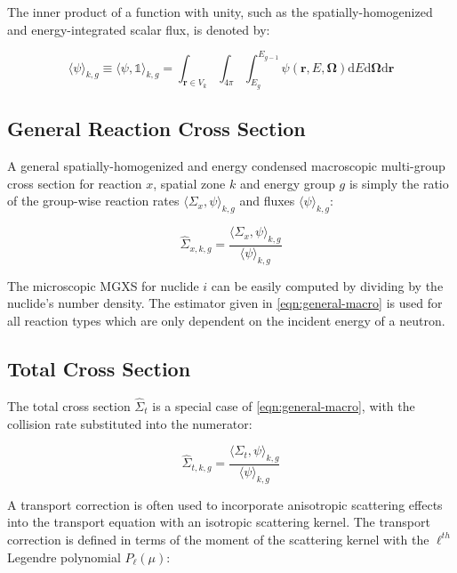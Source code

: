 \noindent The inner product of a function with unity, such as the spatially-homogenized and energy-integrated scalar flux, is denoted by:

\begin{equation}
\label{eqn:angle-flux}
\langle \psi \rangle_{k,g} \equiv \langle \psi, \mathbb{1} \rangle_{k,g} = \int_{\mathbf{r} \in V_{k}} \int_{4\pi} \int_{E_{g}}^{E_{g-1}} \psi(\mathbf{r},E,\mathbf{\Omega}) \mathrm{d}E\mathrm{d}\mathbf{\Omega}\mathrm{d}\mathbf{r}
\end{equation}

\subsection{General Reaction Cross Section}
\label{subsubsec:tally-types-gen-xs}

A general spatially-homogenized and energy condensed macroscopic multi-group cross section for reaction $x$, spatial zone $k$ and energy group $g$ is simply the ratio of the group-wise reaction rates $\langle \Sigma_{x}, \psi \rangle_{k,g}$ and fluxes $\langle \psi \rangle_{k,g}$:

\begin{equation}
\label{eqn:general-macro}
\hat{\Sigma}_{x,k,g} = \frac{\langle \Sigma_{x}, \psi \rangle_{k,g}}{\langle \psi \rangle_{k,g}}
\end{equation}

\noindent The microscopic MGXS for nuclide $i$ can be easily computed by dividing by the nuclide's number density. The estimator given in \autoref{eqn:general-macro} is used for all reaction types which are only dependent on the incident energy of a neutron.

\subsection{Total Cross Section}
\label{subsubsec:tally-types-tot-xs}

The total cross section $\hat{\Sigma}_{t}$ is a special case of \cref{eqn:general-macro}, with the collision rate substituted into the numerator:

\begin{equation}
\label{eqn:total-macro}
\hat{\Sigma}_{t,k,g} = \frac{\langle \Sigma_{t}, \psi \rangle_{k,g}}{\langle \psi \rangle_{k,g}}
\end{equation}

A transport correction is often used to incorporate anisotropic scattering effects into the transport equation with an isotropic scattering kernel. The transport correction is defined in terms of the moment of the scattering kernel with the $\ell^{th}$ Legendre polynomial $P_{\ell}(\mu)$:

